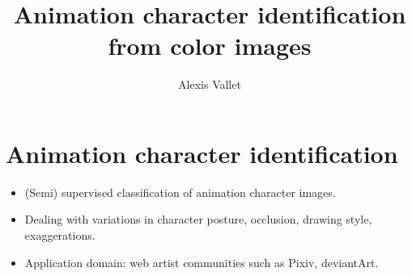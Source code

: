 \documentclass{beamer}
\title{Animation character identification from color images}
\author{Alexis Vallet}
\institute{University of Technology of Belfort-Montbéliard}
\begin{document}
\frame{\titlepage}

\section{Animation character identification}

\begin{frame}
\begin{itemize}
\item (Semi) supervised classification of animation character images.
\item Dealing with variations in character posture, occlusion, drawing style, exaggerations.
\item Application domain: web artist communities such as Pixiv, deviantArt.
\end{itemize}


\end{frame}
\end{document}
